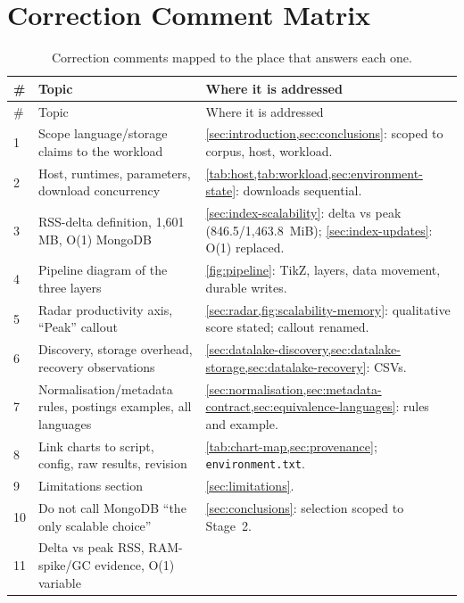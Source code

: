 \section{Correction Comment Matrix}
\label{sec:comment-matrix}

\begin{center}
\footnotesize
\renewcommand{\arraystretch}{0.80}
\begin{longtable}{@{}lp{4.2cm}p{11.2cm}@{}}
    \caption{Correction comments mapped to the place that answers each one.}\label{tab:comment-matrix}\\
    \toprule
    \# & Topic & Where it is addressed \\
    \midrule
    \endfirsthead
    \toprule
    \# & Topic & Where it is addressed \\
    \midrule
    \endhead
    1 & Scope language/storage claims to the workload &
    \cref{sec:introduction,sec:conclusions}: scoped to corpus, host, workload. \\
    2 & Host, runtimes, parameters, download concurrency &
    \cref{tab:host,tab:workload,sec:environment-state}: downloads sequential. \\
    3 & RSS-delta definition, 1{,}601 MB, O(1) MongoDB &
    \cref{sec:index-scalability}: delta vs peak (846.5/1{,}463.8~MiB);
    \cref{sec:index-updates}: O(1) replaced. \\
    4 & Pipeline diagram of the three layers &
    \cref{fig:pipeline}: TikZ, layers, data movement, durable writes. \\
    5 & Radar productivity axis, ``Peak'' callout &
    \cref{sec:radar,fig:scalability-memory}: qualitative score stated; callout renamed. \\
    6 & Discovery, storage overhead, recovery observations &
    \cref{sec:datalake-discovery,sec:datalake-storage,sec:datalake-recovery}: CSVs. \\
    7 & Normalisation/metadata rules, postings examples, all languages &
    \cref{sec:normalisation,sec:metadata-contract,sec:equivalence-languages}: rules and example. \\
    8 & Link charts to script, config, raw results, revision &
    \cref{tab:chart-map,sec:provenance}; \texttt{environment.txt}. \\
    9 & Limitations section & \cref{sec:limitations}. \\
    10 & Do not call MongoDB ``the only scalable choice'' &
    \cref{sec:conclusions}: selection scoped to Stage~2. \\
    11 & Delta vs peak RSS, RAM-spike/GC evidence, O(1) variable &

\end{longtable}
\end{center}
